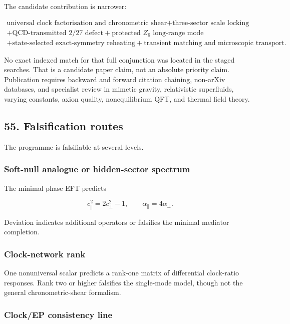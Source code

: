 \documentclass[
]{article}
\begin{document}
The candidate contribution is narrower:

\[
\boxed{
\begin{gathered}
\text{universal clock factorisation and chronometric shear}
+\text{three-sector scale locking}\\
+\text{QCD-transmitted }2/27\text{ defect}
+\text{protected }Z_6\text{ long-range mode}\\
+\text{state-selected exact-symmetry reheating}
+\text{transient matching and microscopic transport}.
\end{gathered}}
\]

No exact indexed match for that full conjunction was located in the
staged searches. That is a candidate paper claim, not an absolute
priority claim. Publication requires backward and forward citation
chaining, non-arXiv databases, and specialist review in mimetic gravity,
relativistic superfluids, varying constants, axion quality,
nonequilibrium QFT, and thermal field theory.

\subsection{55. Falsification routes}\label{falsification-routes}

The programme is falsifiable at several levels.

\subsubsection{Soft-null analogue or hidden-sector
spectrum}\label{soft-null-analogue-or-hidden-sector-spectrum}

The minimal phase EFT predicts

\[
c_\parallel^2=2c_\perp^2-1,
\qquad
\alpha_\parallel=4\alpha_\perp.
\]

Deviation indicates additional operators or falsifies the minimal
mediator completion.

\subsubsection{Clock-network rank}\label{clock-network-rank}

One nonuniversal scalar predicts a rank-one matrix of differential
clock-ratio responses. Rank two or higher falsifies the single-mode
model, though not the general chronometric-shear formalism.

\subsubsection{Clock/EP consistency
line}\label{clockep-consistency-line}
\end{document}

